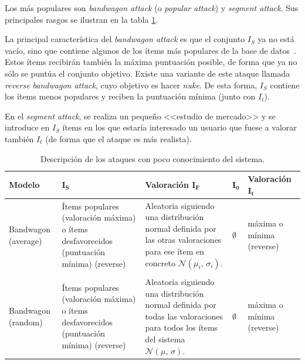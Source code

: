 Los más populares son \textit{bandwagon attack} (o \textit{popular attack}) y \textit{segment attack}. Sus principales rasgos se ilustran en la tabla \ref{tabla_descripcion_ataques_poco_con}.

La principal característica del \textit{bandwagon attack} es que el conjunto $I_S$ ya no está vacío, sino que contiene algunos de los ítems más populares de la base de datos~\cite{zhou2021SemisupervisedRecommendationAttack}. Estos ítems recibirán también la máxima puntuación posible, de forma que ya no sólo se puntúa el conjunto objetivo. Existe una variante de este ataque llamada \textit{reverse bandwagon attack}, cuyo objetivo es hacer \textit{nuke}. De esta forma, $I_S$ contiene los ítems menos populares y reciben la puntuación mínima (junto con $I_t$).

En el \textit{segment attack}, se realiza un pequeño <<estudio de mercado>> y se introduce en $I_S$ ítems en los que estaría interesado un usuario que fuese a valorar también $I_t$ (de forma que el ataque es más realista).

\begin{table}
\small
\begin{centering}
	
		\begin{tabular}{@{}p{5em} p{8em} p{8em} p{2em} p{7em}@{}}
			\toprule
			\textbf{Modelo} & $\mathbf{I_S}$ & \textbf{Valoración} $\mathbf{I_F}$ & $\mathbf{I_0}$ & \textbf{Valoración} $\mathbf{I_t}$\\ 
			\midrule
			
			Bandwagon (average) & Ítems populares (valoración máxima) o ítems desfavorecidos (puntuación mínima) (reverse) & Aleatoria siguiendo una distribución normal definida por las otras valoraciones para ese ítem en concreto $\mathcal{N}(\mu_i,\,\sigma_i)$. & $\emptyset$ & máxima o mínima (reverse) \\\\
			
			Bandwagon (random) & Ítems populares (valoración máxima) o ítems desfavorecidos (puntuación mínima) (reverse) & Aleatoria siguiendo una distribución normal definida por todas las valoraciones para todos los ítems del sistema $\mathcal{N}(\mu,\,\sigma)$. & $\emptyset$ & máxima o mínima (reverse) \\
			\bottomrule
		\end{tabular}

\end{centering}
\caption{Descripción de los ataques con poco conocimiento del sistema.}
\label{tabla_descripcion_ataques_poco_con}
\end{table}



